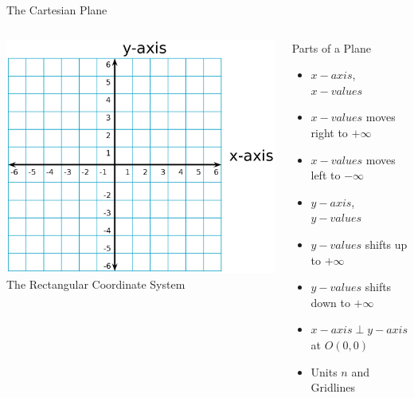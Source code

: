 \documentclass[14pt,aspectratio=169]{beamer}
\begin{document}
\begin{frame}{The Cartesian Plane}
  \begin{columns}
   \centering
    \includegraphics[width=1\textwidth]{image01}\\The Rectangular Coordinate System
    \begin{block}{Parts of a Plane}
     \begin{itemize}
      \item $x-axis$, $x-values$
      \item $x-values$ moves right to $+\infty$
      \item $x-values$ moves left to $-\infty$
      \item $y-axis$, $y-values$
      \item $y-values$ shifts up to $+\infty$
      \item $y-values$ shifts down to $+\infty$
      \item $x-axis\perp y-axis$ at $O(0,0)$
      \item Units $n$ and Gridlines
     \end{itemize}

    \end{block}

  \end{columns}

\end{frame}
\end{document}
